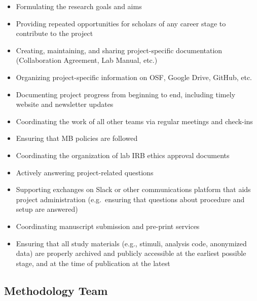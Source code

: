 \documentclass[
  letterpaper,
  DIV=11,
  numbers=noendperiod,
  oneside]{scrreprt}
\providecommand{\tightlist}{%
  \setlength{\itemsep}{0pt}\setlength{\parskip}{0pt}}
\begin{document}
\begin{itemize}
\tightlist
\item
  Formulating the research goals and aims
\item
  Providing repeated opportunities for scholars of any career stage to
  contribute to the project
\item
  Creating, maintaining, and sharing project-specific documentation
  (Collaboration Agreement, Lab Manual, etc.)
\item
  Organizing project-specific information on OSF, Google Drive, GitHub,
  etc.
\item
  Documenting project progress from beginning to end, including timely
  website and newsletter updates
\item
  Coordinating the work of all other teams via regular meetings and
  check-ins
\item
  Ensuring that MB policies are followed
\item
  Coordinating the organization of lab IRB ethics approval documents
\item
  Actively answering project-related questions
\item
  Supporting exchanges on Slack or other communications platform that
  aids project administration (e.g.~ensuring that questions about
  procedure and setup are answered)
\item
  Coordinating manuscript submission and pre-print services
\item
  Ensuring that all study materials (e.g., stimuli, analysis code,
  anonymized data) are properly archived and publicly accessible at the
  earliest possible stage, and at the time of publication at the latest
\end{itemize}

\subsection{Methodology Team}\label{methodology-team}
\end{document}
